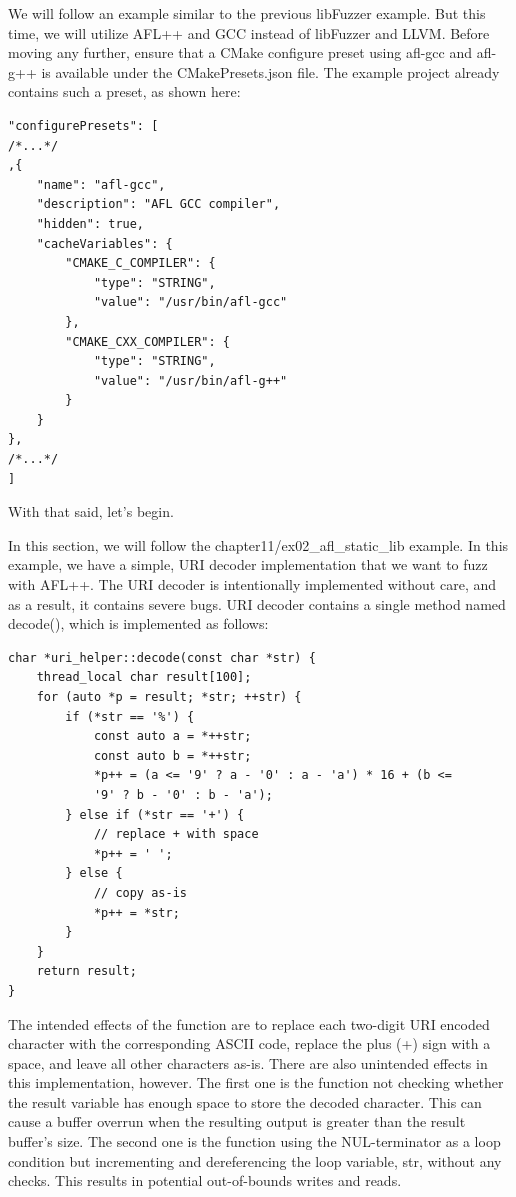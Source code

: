 We will follow an example similar to the previous libFuzzer example. But this time, we will utilize AFL++ and GCC instead of libFuzzer and LLVM. Before moving any further, ensure that a CMake configure preset using afl-gcc and afl-g++ is available under the CMakePresets.json file. The example project already contains such a preset, as shown here:

\begin{lstlisting}[style=styleCMake]
"configurePresets": [
/*...*/
,{
	"name": "afl-gcc",
	"description": "AFL GCC compiler",
	"hidden": true,
	"cacheVariables": {
		"CMAKE_C_COMPILER": {
			"type": "STRING",
			"value": "/usr/bin/afl-gcc"
		},
		"CMAKE_CXX_COMPILER": {
			"type": "STRING",
			"value": "/usr/bin/afl-g++"
		}
	}
},
/*...*/
]
\end{lstlisting}

With that said, let's begin.

In this section, we will follow the chapter11/ex02\_afl\_static\_lib example. In this example, we have a simple, URI decoder implementation that we want to fuzz with AFL++. The URI decoder is intentionally implemented without care, and as a result, it contains severe bugs. URI decoder contains a single method named decode(), which is implemented as follows:

\begin{lstlisting}[style=styleCXX]
char *uri_helper::decode(const char *str) {
	thread_local char result[100];
	for (auto *p = result; *str; ++str) {
		if (*str == '%') {
			const auto a = *++str;
			const auto b = *++str;
			*p++ = (a <= '9' ? a - '0' : a - 'a') * 16 + (b <=
			'9' ? b - '0' : b - 'a');
		} else if (*str == '+') {
			// replace + with space
			*p++ = ' ';
		} else {
			// copy as-is
			*p++ = *str;
		}
	}
	return result;
}
\end{lstlisting}

The intended effects of the function are to replace each two-digit URI encoded character with the corresponding ASCII code, replace the plus (+) sign with a space, and leave all other characters as-is. There are also unintended effects in this implementation, however. The first one is the function not checking whether the result variable has enough space to store the decoded character. This can cause a buffer overrun when the resulting output is greater than the result buffer's size. The second one is the function using the NUL-terminator as a loop condition but incrementing and dereferencing the loop variable, str, without any checks. This results in potential out-of-bounds writes and reads.

